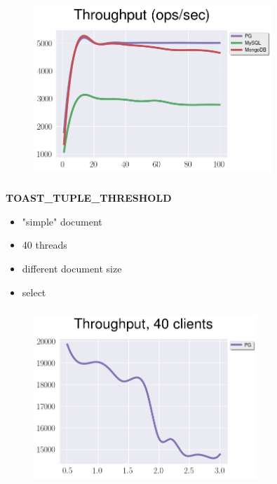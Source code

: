 \documentclass[usenames,dvipsnames, 18pt, compress, aspectratio=169]{beamer}
\begin{document}
\begin{frame}
    \frametitle{}
    \begin{center}
    \vspace{10pt}
    \begin{figure}
        \includegraphics[width=0.8\textwidth,center]{benchmarks/select_complex_btree_throughput.png}
    \end{figure}
    \end{center}
\end{frame}

\begin{frame}
    \frametitle{}
    \begin{center}
        \textbf{TOAST\_TUPLE\_THRESHOLD}
        \begin{itemize}[label={}]
            \item "simple" document
            \item 40 threads
            \item different document size
            \item select
        \end{itemize}
    \end{center}
\end{frame}

\begin{frame}
    \frametitle{}
    \begin{center}
    \vspace{10pt}
    \begin{figure}
        \includegraphics[width=0.75\textwidth,center]{benchmarks/workload_c_toast.png}
    \end{figure}

    \end{center}
\end{frame}
\end{document}
